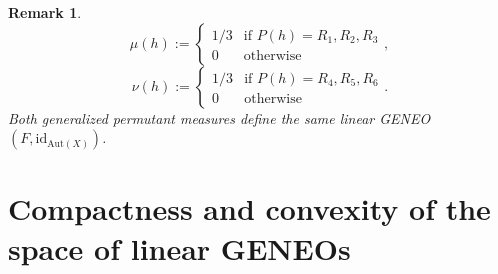 \documentclass[11pt]{article}
\newcommand{\R}{\mathbb{R}}
\newcommand{\Aut}{\mathrm{Aut}}
\newtheorem{rem}[theorem]{Remark}
\begin{document}
\begin{rem}
    \[
    \mu(h) := \begin{cases}
        1/3 & \text{if } P(h) = R_1, R_2, R_3 \\
        0 & \text{otherwise}
    \end{cases},
    \]
    \[
    \nu(h) := \begin{cases}
        1/3 & \text{if } P(h) = R_4, R_5, R_6 \\
        0 & \text{otherwise}
    \end{cases}.
    \]
    Both generalized permutant measures define the same linear GENEO $(F,\mathrm{id}_{\Aut(X)})$.
\end{rem}

\section{Compactness and convexity of the space of linear GENEOs}
\label{Compactness}
\end{document}
